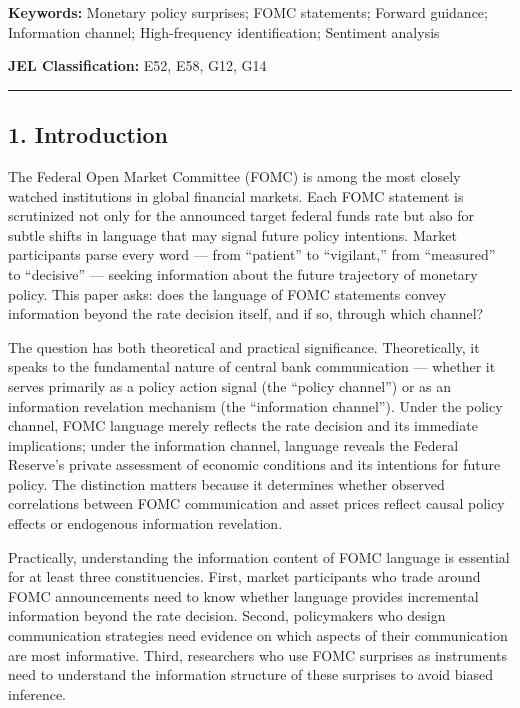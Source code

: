 \documentclass[12pt]{article}
\begin{document}
\textbf{Keywords:} Monetary policy surprises; FOMC statements; Forward
guidance; Information channel; High-frequency identification; Sentiment
analysis

\textbf{JEL Classification:} E52, E58, G12, G14

\begin{center}\rule{0.5\linewidth}{0.5pt}\end{center}

\subsection{1. Introduction}\label{introduction}

The Federal Open Market Committee (FOMC) is among the most closely
watched institutions in global financial markets. Each FOMC statement is
scrutinized not only for the announced target federal funds rate but
also for subtle shifts in language that may signal future policy
intentions. Market participants parse every word --- from ``patient'' to
``vigilant,'' from ``measured'' to ``decisive'' --- seeking information
about the future trajectory of monetary policy. This paper asks: does
the language of FOMC statements convey information beyond the rate
decision itself, and if so, through which channel?

The question has both theoretical and practical significance.
Theoretically, it speaks to the fundamental nature of central bank
communication --- whether it serves primarily as a policy action signal
(the ``policy channel'') or as an information revelation mechanism (the
``information channel''). Under the policy channel, FOMC language merely
reflects the rate decision and its immediate implications; under the
information channel, language reveals the Federal Reserve's private
assessment of economic conditions and its intentions for future policy.
The distinction matters because it determines whether observed
correlations between FOMC communication and asset prices reflect causal
policy effects or endogenous information revelation.

Practically, understanding the information content of FOMC language is
essential for at least three constituencies. First, market participants
who trade around FOMC announcements need to know whether language
provides incremental information beyond the rate decision. Second,
policymakers who design communication strategies need evidence on which
aspects of their communication are most informative. Third, researchers
who use FOMC surprises as instruments need to understand the information
structure of these surprises to avoid biased inference.
\end{document}

